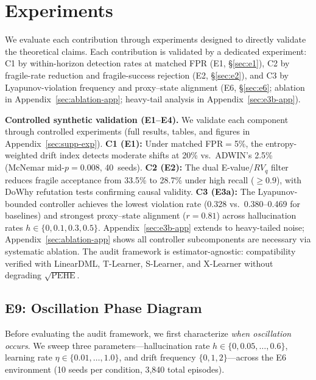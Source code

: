\documentclass{article}
\begin{document}
\section{Experiments}
\label{sec:experiments}


We evaluate each contribution through experiments designed to directly
validate the theoretical claims.
Each contribution is validated by a dedicated experiment:
C1 by within-horizon detection rates at matched FPR
(E1, \S\ref{sec:e1}),
C2 by fragile-rate reduction and fragile-success rejection
(E2, \S\ref{sec:e2}), and
C3 by Lyapunov-violation frequency and proxy--state alignment
(E6, \S\ref{sec:e6}; ablation in Appendix~\ref{sec:ablation-app};
heavy-tail analysis in Appendix~\ref{sec:e3b-app}).


\textbf{Controlled synthetic validation (E1--E4).}
We validate each component through controlled experiments
(full results, tables, and figures in Appendix~\ref{sec:supp-exp}).
\textbf{C1 (E1):} Under matched FPR$=$5\%, the entropy-weighted
drift index detects moderate shifts at 20\% vs.\ ADWIN's 2.5\%
(McNemar mid-$p{=}0.008$, 40~seeds).
\textbf{C2 (E2):} The dual E-value/$RV_q$ filter reduces fragile
acceptance from 33.5\% to 28.7\% under high recall ($\geq 0.9$),
with DoWhy refutation tests confirming causal validity.
\textbf{C3 (E3a):} The Lyapunov-bounded controller achieves the
lowest violation rate (0.328 vs.\ 0.380--0.469 for baselines) and
strongest proxy--state alignment ($r{=}0.81$) across hallucination
rates $h \in \{0, 0.1, 0.3, 0.5\}$.
Appendix~\ref{sec:e3b-app} extends to heavy-tailed noise;
Appendix~\ref{sec:ablation-app} shows all controller subcomponents
are necessary via systematic ablation.
The audit framework is estimator-agnostic: compatibility verified
with LinearDML, T-Learner, S-Learner, and X-Learner without
degrading $\sqrt{\mathrm{PEHE}}$.

\subsection{E9: Oscillation Phase Diagram}
\label{sec:e9}

Before evaluating the audit framework, we first characterize \emph{when oscillation occurs}. We sweep three parameters---hallucination rate $h \in \{0, 0.05, \ldots, 0.6\}$, learning rate $\eta \in \{0.01, \ldots, 1.0\}$, and drift frequency $\{0, 1, 2\}$---across the E6 environment (10 seeds per condition, 3{,}840 total episodes).
\end{document}
